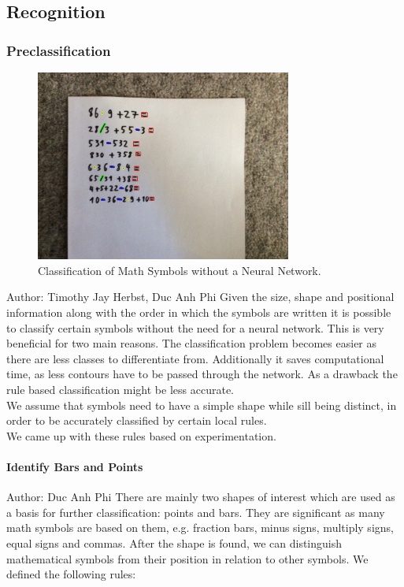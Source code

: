 \documentclass[12pt]{article}
\begin{document}
	\pagebreak\subsection{Recognition}
	\subsubsection{Preclassification}
	
	\begin{figure}[h!]
		\centering
		\includegraphics[width=0.75\textwidth]{ImagesForReport/preclassify.jpg}
		\caption{Classification of Math Symbols without a Neural Network.}
		\label{fig:preclassify}
	\end{figure}

	\small{Author: Timothy Jay Herbst, Duc Anh Phi} \newline \newline
	Given the size, shape and positional information along with the order in which the symbols are written it is possible to classify certain symbols without the need for a neural network. This is very beneficial for two main reasons. The classification problem becomes easier as there are less classes to differentiate from. Additionally it saves computational time, as less contours have to be passed through the network. As a drawback the rule based classification might be less accurate.\\
	We assume that symbols need to have a simple shape while sill being distinct, in order to be accurately classified by certain local rules.\\
	We came up with these rules based on experimentation.
	
	\paragraph{Identify Bars and Points}
	\small{Author: Duc Anh Phi} \newline \newline
	There are mainly two shapes of interest which are used as a basis for further classification: points and bars. They are significant as many math symbols are based on them, e.g. fraction bars, minus signs, multiply signs, equal signs and commas. After the shape is found, we can distinguish mathematical symbols from their position in relation to other symbols. We defined the following rules:
	
\end{document}
